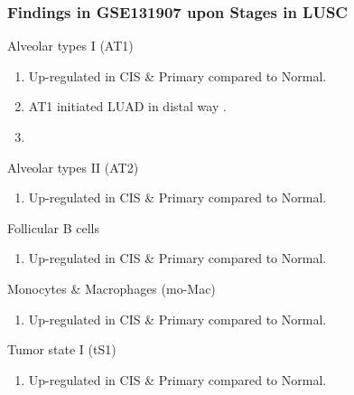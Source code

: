 \documentclass{beamer}
\begin{document}
    \begin{frame}[allowframebreaks]
        \frametitle{Findings in GSE131907 upon Stages in LUSC}

        \begin{block}{Alveolar types I (AT1)}
            \begin{enumerate}
                \item Up-regulated in CIS \& Primary compared to Normal.
                \item AT1 initiated LUAD in distal way \cite{AT1-1}.
                \item
            \end{enumerate}
        \end{block}

        \begin{block}{Alveolar types II (AT2)}
            \begin{enumerate}
                \item Up-regulated in CIS \& Primary compared to Normal.
            \end{enumerate}
        \end{block}

        \begin{block}{Follicular B cells}
            \begin{enumerate}
                \item Up-regulated in CIS \& Primary compared to Normal.
            \end{enumerate}
        \end{block}

        \begin{block}{Monocytes \& Macrophages (mo-Mac)}
            \begin{enumerate}
                \item Up-regulated in CIS \& Primary compared to Normal.
            \end{enumerate}
        \end{block}

        \begin{block}{Tumor state I (tS1)}
            \begin{enumerate}
                \item Up-regulated in CIS \& Primary compared to Normal.
            \end{enumerate}
        \end{block}
    \end{frame}
\end{document}
